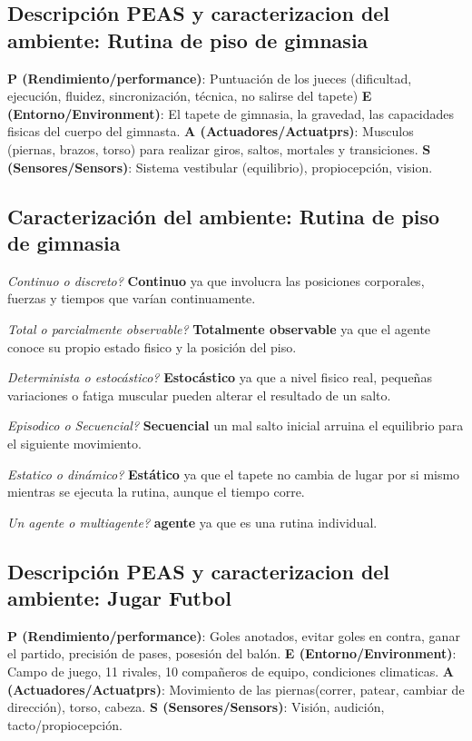 \subsection{Descripción PEAS y caracterizacion del ambiente:  Rutina de piso de gimnasia}

\textbf{P (Rendimiento/performance)}: Puntuación de los jueces (dificultad, ejecución, fluidez, sincronización, técnica, no salirse del tapete)
\textbf{E (Entorno/Environment)}: El tapete de gimnasia, la gravedad, las capacidades fisicas del cuerpo del gimnasta.
\textbf{A (Actuadores/Actuatprs)}: Musculos (piernas, brazos, torso) para realizar giros, saltos, mortales y transiciones.
\textbf{S (Sensores/Sensors)}: Sistema vestibular (equilibrio), propiocepción, vision.

\subsection{Caracterización del ambiente: Rutina de piso de gimnasia}

\textit{Continuo o discreto?} \textbf{Continuo} ya que involucra las posiciones corporales, fuerzas y tiempos que varían continuamente.

\textit{Total o parcialmente observable?} \textbf{Totalmente observable} ya que el agente conoce su propio estado fisico y la posición del piso.

\textit{Determinista o estocástico?} \textbf{Estocástico} ya que a nivel fisico real, pequeñas variaciones o fatiga muscular pueden alterar el resultado de un salto.

\textit{Episodico o Secuencial?} \textbf{Secuencial} un mal salto inicial arruina el equilibrio para el siguiente movimiento.

\textit{Estatico o dinámico?} \textbf{Estático} ya que el tapete no cambia de lugar por si mismo mientras se ejecuta la rutina, aunque el tiempo corre.

\textit{Un agente o multiagente?} \textbf{agente} ya que es una rutina individual.


\subsection{Descripción PEAS y caracterizacion del ambiente:  Jugar Futbol}

\textbf{P (Rendimiento/performance)}: Goles anotados, evitar goles en contra, ganar el partido, precisión de pases, posesión del balón.
\textbf{E (Entorno/Environment)}: Campo de juego, 11 rivales, 10 compañeros de equipo, condiciones climaticas.
\textbf{A (Actuadores/Actuatprs)}: Movimiento de las piernas(correr, patear, cambiar de dirección), torso, cabeza.
\textbf{S (Sensores/Sensors)}: Visión, audición, tacto/propiocepción.

